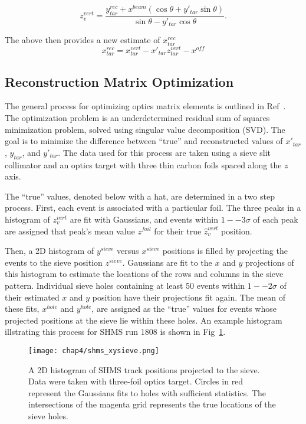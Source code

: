\begin{equation}
    z^{vert}_v = \frac{y^{rec}_{tar} + x^{beam} (\cos\theta + y'_{tar} \sin\theta)}
                      {\sin\theta - y'_{tar}\cos\theta}.
\end{equation}

The above then provides a new estimate of $x^{rec}_{tar}$
\begin{equation}
    x^{rec}_{tar} = x^{vert}_{tar} - x'_{tar}z^{vert}_{tar} - x^{off}
\end{equation}

\subsection{Reconstruction Matrix Optimization}
The general process for optimizing optics matrix elements is outlined in
Ref~\cite{Bericic_2017}.
The optimization problem is an underdetermined residual sum of squares
minimization problem, solved using singular value decomposition (SVD).
The goal is to minimize the difference between ``true'' and reconstructed
values of $x'_{tar}$, $y_{tar}$, and $y'_{tar}$.
The data used for this process are taken using a sieve slit collimator and
an optics target with three thin carbon foils spaced along the $z$ axis.


The ``true'' values, denoted below with a hat, are determined in a two step
process.
First, each event is associated with a particular foil.
The three peaks in a histogram of $z^{vert}_v$ are fit with Gaussians, and
events within $1--3\sigma$ of each peak are assigned that peak's mean value
$z^{foil}$ for their true $\hat{z}^{vert}_v$ position.


Then, a 2D histogram of $y^{sieve}$ versus $x^{sieve}$ positions is filled by
projecting the events to the sieve position $z^{sieve}$.
Gaussians are fit to the $x$ and $y$ projections of this histogram to estimate
the locations of the rows and columns in the sieve pattern.
Individual sieve holes containing at least 50 events within $1--2\sigma$ of
their estimated $x$ and $y$ position have their projections fit again.
The mean of these fits, $x^{hole}$ and $y^{hole}$, are assigned as the ``true''
values for events whose projected positions at the sieve lie within these
holes.
An example histogram illstrating this process for SHMS run 1808 is shown in
Fig~\ref{fig:shms_xysieve}.

\begin{figure}[!h]
    \centering
    \texttt{[image: chap4/shms\_xysieve.png]}
    \caption[ A 2D histogram of SHMS track positions projected to the sieve.]{
            A 2D histogram of SHMS track positions projected to the sieve.
            Data were taken with three-foil optics target.
            Circles in red represent the Gaussians fits to holes with
            sufficient statistics.
            The intersections of the magenta grid represents the true locations
            of the sieve holes.
            }
    \label{fig:shms_xysieve}
\end{figure}


